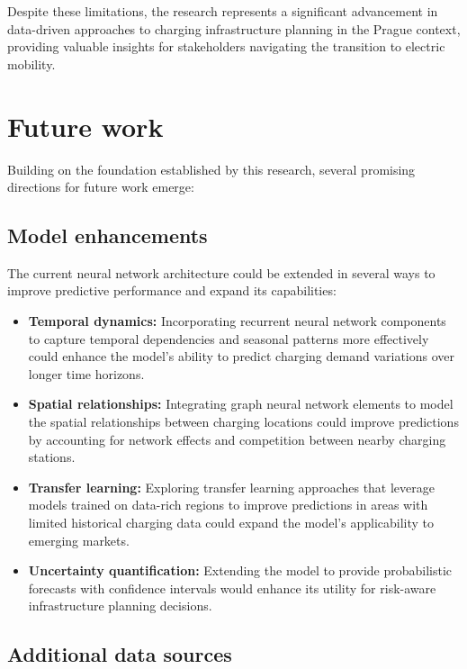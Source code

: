 Despite these limitations, the research represents a significant advancement in data-driven approaches to charging infrastructure planning in the Prague context, providing valuable insights for stakeholders navigating the transition to electric mobility.

\section{Future work}

Building on the foundation established by this research, several promising directions for future work emerge:

\subsection{Model enhancements}

The current neural network architecture could be extended in several ways to improve predictive performance and expand its capabilities:

\begin{itemize}
    \item \textbf{Temporal dynamics:} Incorporating recurrent neural network components to capture temporal dependencies and seasonal patterns more effectively could enhance the model's ability to predict charging demand variations over longer time horizons.

    \item \textbf{Spatial relationships:} Integrating graph neural network elements to model the spatial relationships between charging locations could improve predictions by accounting for network effects and competition between nearby charging stations.

    \item \textbf{Transfer learning:} Exploring transfer learning approaches that leverage models trained on data-rich regions to improve predictions in areas with limited historical charging data could expand the model's applicability to emerging markets.

    \item \textbf{Uncertainty quantification:} Extending the model to provide probabilistic forecasts with confidence intervals would enhance its utility for risk-aware infrastructure planning decisions.
\end{itemize}

\subsection{Additional data sources}

